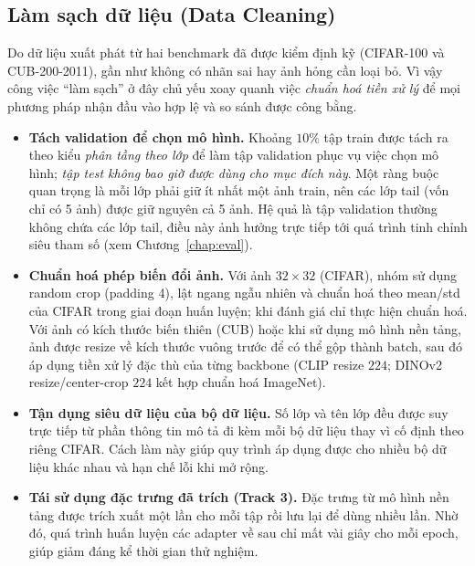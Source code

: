\subsection{Làm sạch dữ liệu (Data Cleaning)}

Do dữ liệu xuất phát từ hai benchmark đã được kiểm định kỹ (CIFAR-100 và CUB-200-2011), gần như
không có nhãn sai hay ảnh hỏng cần loại bỏ. Vì vậy công việc ``làm sạch'' ở đây chủ yếu xoay quanh
việc \emph{chuẩn hoá tiền xử lý} để mọi phương pháp nhận đầu vào hợp lệ và so sánh được công bằng.

\begin{itemize}

    \item \textbf{Tách validation để chọn mô hình.}
    Khoảng $10\%$ tập train được tách ra theo kiểu \emph{phân tầng theo lớp} để làm tập validation
    phục vụ việc chọn mô hình; \emph{tập test không bao giờ được dùng cho mục đích này}. Một ràng
    buộc quan trọng là mỗi lớp phải giữ ít nhất một ảnh train, nên các lớp tail (vốn chỉ có 5 ảnh)
    được giữ nguyên cả 5 ảnh. Hệ quả là tập validation thường không chứa các lớp tail, điều này ảnh
    hưởng trực tiếp tới quá trình tinh chỉnh siêu tham số (xem Chương~\ref{chap:eval}).

    \item \textbf{Chuẩn hoá phép biến đổi ảnh.}
    Với ảnh $32\times32$ (CIFAR), nhóm sử dụng random crop (padding 4), lật ngang ngẫu nhiên và
    chuẩn hoá theo mean/std của CIFAR trong giai đoạn huấn luyện; khi đánh giá chỉ thực hiện chuẩn
    hoá. Với ảnh có kích thước biến thiên (CUB) hoặc khi sử dụng mô hình nền tảng, ảnh được resize
    về kích thước vuông trước để có thể gộp thành batch, sau đó áp dụng tiền xử lý đặc thù của từng
    backbone (CLIP resize $224$; DINOv2 resize/center-crop $224$ kết hợp chuẩn hoá ImageNet).

    \item \textbf{Tận dụng siêu dữ liệu của bộ dữ liệu.}
    Số lớp và tên lớp đều được suy trực tiếp từ phần thông tin mô tả đi kèm mỗi bộ dữ liệu thay vì
    cố định theo riêng CIFAR. Cách làm này giúp quy trình áp dụng được cho nhiều bộ dữ liệu khác
    nhau và hạn chế lỗi khi mở rộng.

    \item \textbf{Tái sử dụng đặc trưng đã trích (Track 3).}
    Đặc trưng từ mô hình nền tảng được trích xuất một lần cho mỗi tập rồi lưu lại để dùng nhiều lần.
    Nhờ đó, quá trình huấn luyện các adapter về sau chỉ mất vài giây cho mỗi epoch, giúp giảm đáng
    kể thời gian thử nghiệm.

\end{itemize}

